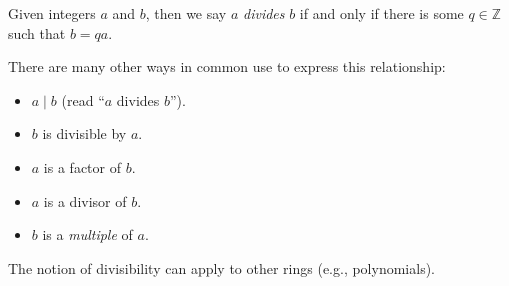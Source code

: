 \documentclass{article}
\begin{document}
Given integers $a$ and $b$, then we say $a$ \emph{divides} $b$ if and only if there is some $q \in \mathbb{Z}$ such that $b=qa$.

There are many other ways in common use to express this relationship:

\begin{itemize}
\item $a\mid b$ (read ``$a$ divides $b$'').
\item $b$ is divisible by $a$.
\item $a$ is a factor of $b$.
\item $a$ is a divisor of $b$.
\item $b$ is a \emph{multiple} of $a$.
\end{itemize}

The notion of divisibility can apply to other rings (e.g., polynomials).
\end{document}
